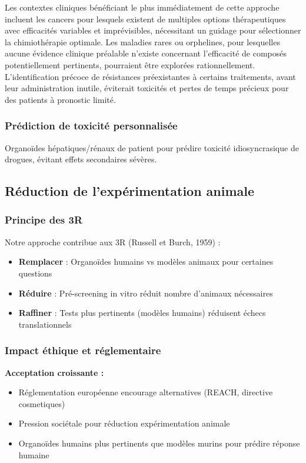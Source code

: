 Les contextes cliniques bénéficiant le plus immédiatement de cette approche incluent les cancers pour lesquels existent de multiples options thérapeutiques avec efficacités variables et imprévisibles, nécessitant un guidage pour sélectionner la chimiothérapie optimale. Les maladies rares ou orphelines, pour lesquelles aucune évidence clinique préalable n'existe concernant l'efficacité de composés potentiellement pertinents, pourraient être explorées rationnellement. L'identification précoce de résistances préexistantes à certains traitements, avant leur administration inutile, éviterait toxicités et pertes de temps précieux pour des patients à pronostic limité.

\subsubsection{Prédiction de toxicité personnalisée}

Organoïdes hépatiques/rénaux de patient pour prédire toxicité idiosyncrasique de drogues, évitant effets secondaires sévères.

\subsection{Réduction de l'expérimentation animale}

\subsubsection{Principe des 3R}

Notre approche contribue aux 3R (Russell et Burch, 1959) :
\begin{itemize}
    \item \textbf{Remplacer} : Organoïdes humains vs modèles animaux pour certaines questions
    \item \textbf{Réduire} : Pré-screening in vitro réduit nombre d'animaux nécessaires
    \item \textbf{Raffiner} : Tests plus pertinents (modèles humains) réduisent échecs translationnels
\end{itemize}

\subsubsection{Impact éthique et réglementaire}

\textbf{Acceptation croissante :}
\begin{itemize}
    \item Réglementation européenne encourage alternatives (REACH, directive cosmetiques)
    \item Pression sociétale pour réduction expérimentation animale
    \item Organoïdes humains plus pertinents que modèles murins pour prédire réponse humaine
\end{itemize}

